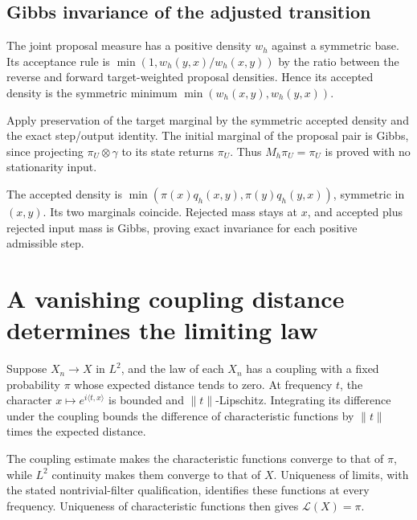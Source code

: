 \documentclass[11pt,a4paper]{report}
\begin{document}
\subsection{\texorpdfstring{Gibbs invariance of the adjusted transition}{Gibbs invariance of the adjusted transition}}
\label{report-step-UnadjustedLangevin-MALAInvariance-lean-6}


The joint proposal measure has a positive density \(w_h\) against a symmetric base. Its acceptance rule is \(\min(1,w_h(y,x)/w_h(x,y))\) by the ratio between the reverse and forward target-weighted proposal densities. Hence its accepted density is the symmetric minimum \(\min(w_h(x,y),w_h(y,x))\).



Apply preservation of the target marginal by the symmetric accepted density and the exact step/\allowbreak{}output identity. The initial marginal of the proposal pair is Gibbs, since projecting \(\pi_U\otimes\gamma\) to its state returns \(\pi_U\). Thus \(M_h\pi_U=\pi_U\) is proved with no stationarity input.



The accepted density is \(\min(\pi(x)q_h(x,y),\pi(y)q_h(y,x))\), symmetric in \((x,y)\). Its two marginals coincide. Rejected mass stays at \(x\), and accepted plus rejected input mass is Gibbs, proving exact invariance for each positive admissible step.

\section{\texorpdfstring{A vanishing coupling distance determines the limiting law}{A vanishing coupling distance determines the limiting law}}
\label{proof-module-UnadjustedLangevin-CouplingLimit-lean}


Suppose \(X_n\to X\) in \(L^2\), and the law of each \(X_n\) has a coupling with a fixed probability \(\pi\) whose expected distance tends to zero. At frequency \(t\), the character \(x\mapsto e^{i\langle t,x\rangle}\) is bounded and \(\|t\|\)-Lipschitz. Integrating its difference under the coupling bounds the difference of characteristic functions by \(\|t\|\) times the expected distance.



The coupling estimate makes the characteristic functions converge to that of \(\pi\), while \(L^2\) continuity makes them converge to that of \(X\). Uniqueness of limits, with the stated nontrivial-filter qualification, identifies these functions at every frequency. Uniqueness of characteristic functions then gives \(\mathcal L(X)=\pi\).
\end{document}
